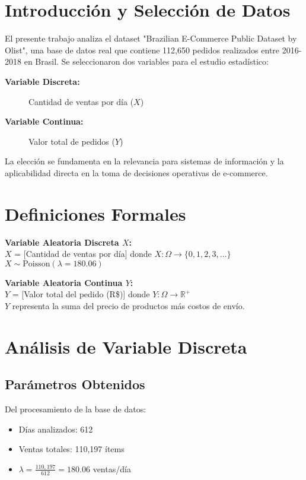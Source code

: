 \documentclass[12pt,a4paper,twoside]{article}
\begin{document}
\section{Introducción y Selección de Datos}

El presente trabajo analiza el dataset "Brazilian E-Commerce Public Dataset by Olist", una base de datos real que contiene 112,650 pedidos realizados entre 2016-2018 en Brasil. Se seleccionaron dos variables para el estudio estadístico:

\begin{description}
  \item[\textbf{Variable Discreta:}] Cantidad de ventas por día ($X$)
  \item[\textbf{Variable Continua:}] Valor total de pedidos ($Y$)
\end{description}

La elección se fundamenta en la relevancia para sistemas de información y la aplicabilidad directa en la toma de decisiones operativas de e-commerce.

\section{Definiciones Formales}

\begin{definicionbox}
\textbf{Variable Aleatoria Discreta $X$:} \\
$X$ = [Cantidad de ventas por día] donde $X: \Omega \rightarrow \{0, 1, 2, 3, ...\}$ \\
$X \sim \text{Poisson}(\lambda = 180.06)$

\noindent\textbf{Variable Aleatoria Continua $Y$:} \\
$Y$ = [Valor total del pedido (R\$)] donde $Y: \Omega \rightarrow \mathbb{R}^+$ \\
$Y$ representa la suma del precio de productos más costos de envío.
\end{definicionbox}

\section{Análisis de Variable Discreta}

\subsection{Parámetros Obtenidos}
Del procesamiento de la base de datos:
\begin{itemize}
    \item Días analizados: 612
    \item Ventas totales: 110,197 ítems
    \item $\lambda = \frac{110,197}{612} = 180.06$ ventas/día
\end{itemize}
\end{document}
